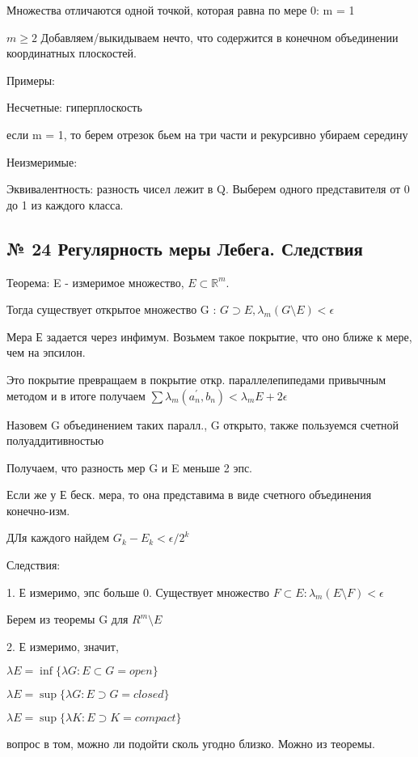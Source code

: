 \documentclass{article}
\begin{document}
Множества отличаются одной точкой, которая равна по мере 0: m = 1

$m \geq 2$ Добавляем/выкидываем нечто, что содержится в конечном объединении координатных плоскостей.

Примеры:

Несчетные: гиперплоскость

если m = 1, то берем отрезок бьем на три части и рекурсивно убираем середину

Неизмеримые:

Эквивалентность: разность чисел лежит в Q. Выберем одного представителя от 0 до 1 из каждого класса.


\subsection{ \footnotesize № 24 Регулярность меры Лебега. Следствия}

Теорема: E - измеримое множество, $E \subset \mathbb{R}^m$.

Тогда существует открытое множество G : $G \supset E, \lambda_m(G \setminus E) < \epsilon$

Мера Е задается через инфимум. Возьмем такое покрытие, что оно ближе к мере, чем на эпсилон.

Это покрытие превращаем в покрытие откр. параллелепипедами привычным методом и в итоге получаем $\sum{\lambda_m(a_n^\prime, b_n)} < \lambda_m E + 2\epsilon$

Назовем G объединением таких паралл., G открыто, также пользуемся счетной полуаддитивностью

Получаем, что разность мер G и E меньше 2 эпс.

Если же у Е беск. мера, то она представима в виде счетного объединения конечно-изм.

ДЛя каждого найдем $G_k - E_k < \epsilon/2^k$

Следствия:

1. Е измеримо, эпс больше 0. Существует множество $F \subset E : \lambda_m(E \setminus F) < \epsilon$

Берем из теоремы G для $R^m \setminus E$

2. Е измеримо, значит,

$\lambda E = \inf{\{\lambda G : E \subset G=open\}}$

$\lambda E = \sup{\{\lambda G : E \supset G=closed\}}$
	
$\lambda E = \sup{\{\lambda K : E \supset K = compact\}}$

вопрос в том, можно ли подойти сколь угодно близко. Можно из теоремы.
\end{document}
